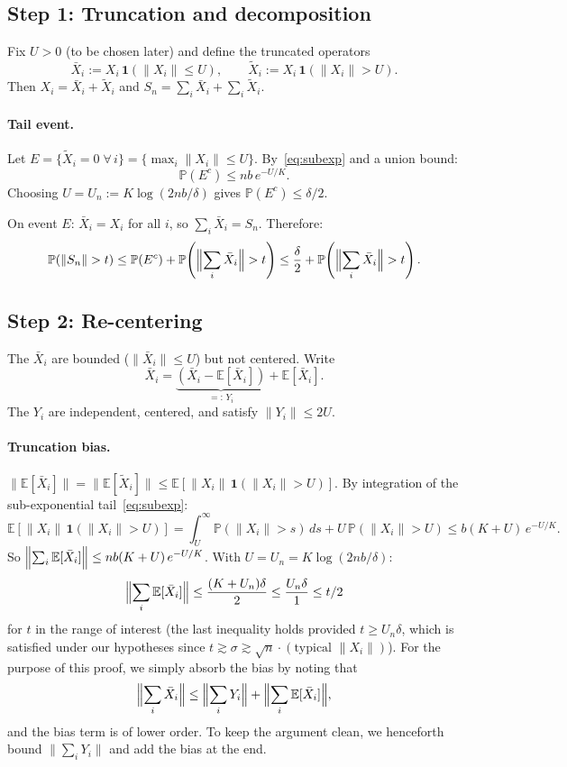 \documentclass[11pt]{article}
\newcommand{\E}{\mathbb{E}}
\newcommand{\PP}{\mathbb{P}}
\newcommand{\norm}[1]{\|#1\|}
\begin{document}
\subsection*{Step 1: Truncation and decomposition}

Fix $U>0$ (to be chosen later) and define the truncated operators
\[
\bar X_i := X_i\,\mathbf{1}(\norm{X_i}\leq U),\qquad
\tilde X_i := X_i\,\mathbf{1}(\norm{X_i}>U).
\]
Then $X_i = \bar X_i + \tilde X_i$ and $S_n = \sum_i \bar X_i + \sum_i \tilde X_i$.

\paragraph{Tail event.}
Let $E=\{\tilde X_i=0\;\forall\,i\}=\{\max_i\norm{X_i}\leq U\}$. By~\eqref{eq:subexp} and a union bound:
\begin{equation}\label{eq:tail_event}
\PP(E^c)\leq nb\,e^{-U/K}.
\end{equation}
Choosing $U=U_n:=K\log(2nb/\delta)$ gives $\PP(E^c)\leq\delta/2$.

On event $E$: $\bar X_i = X_i$ for all $i$, so $\sum_i\bar X_i = S_n$. Therefore:
\begin{equation}\label{eq:event_decomp}
\PP(\norm{S_n}>t)\leq \PP(E^c)+\PP\!\left(\Bigl\|\sum_i\bar X_i\Bigr\|>t\right)
\leq \frac{\delta}{2}+\PP\!\left(\Bigl\|\sum_i\bar X_i\Bigr\|>t\right).
\end{equation}

\subsection*{Step 2: Re-centering}

The $\bar X_i$ are bounded ($\norm{\bar X_i}\leq U$) but not centered. Write
\[
\bar X_i = \underbrace{(\bar X_i - \E[\bar X_i])}_{=:\,Y_i} + \E[\bar X_i].
\]
The $Y_i$ are independent, centered, and satisfy $\norm{Y_i}\leq 2U$.

\paragraph{Truncation bias.}
$\norm{\E[\bar X_i]}=\norm{\E[\tilde X_i]}
\leq \E[\norm{X_i}\,\mathbf{1}(\norm{X_i}>U)]$.
By integration of the sub-exponential tail~\eqref{eq:subexp}:
\[
\E[\norm{X_i}\,\mathbf{1}(\norm{X_i}>U)]
= \int_U^\infty \PP(\norm{X_i}>s)\,ds + U\,\PP(\norm{X_i}>U)
\leq b(K+U)\,e^{-U/K}.
\]
So $\Bigl\|\sum_i\E[\bar X_i]\Bigr\|\leq nb(K+U)\,e^{-U/K}$. With $U=U_n=K\log(2nb/\delta)$:
\begin{equation}\label{eq:bias}
\Bigl\|\sum_i\E[\bar X_i]\Bigr\|\leq \frac{(K+U_n)\delta}{2}\leq \frac{U_n\delta}{1}\leq t/2
\end{equation}
for $t$ in the range of interest (the last inequality holds provided $t\geq U_n\delta$, which is satisfied under our hypotheses since $t\gtrsim\sigma\gtrsim \sqrt{n}\cdot(\text{typical }\norm{X_i})$). For the purpose of this proof, we simply absorb the bias by noting that
\[
\Bigl\|\sum_i\bar X_i\Bigr\|\leq \Bigl\|\sum_i Y_i\Bigr\| + \Bigl\|\sum_i\E[\bar X_i]\Bigr\|,
\]
and the bias term is of lower order.  To keep the argument clean, we henceforth bound $\|\sum_i Y_i\|$ and add the bias at the end.
\end{document}
